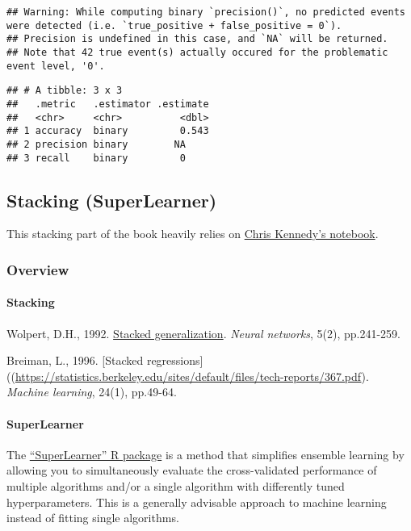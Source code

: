\documentclass[
]{book}
\begin{document}
\begin{verbatim}
## Warning: While computing binary `precision()`, no predicted events were detected (i.e. `true_positive + false_positive = 0`). 
## Precision is undefined in this case, and `NA` will be returned.
## Note that 42 true event(s) actually occured for the problematic event level, '0'.
\end{verbatim}

\begin{verbatim}
## # A tibble: 3 x 3
##   .metric   .estimator .estimate
##   <chr>     <chr>          <dbl>
## 1 accuracy  binary         0.543
## 2 precision binary        NA    
## 3 recall    binary         0
\end{verbatim}

\hypertarget{stacking-superlearner}{%
\subsection{Stacking (SuperLearner)}\label{stacking-superlearner}}

This stacking part of the book heavily relies on \href{https://github.com/dlab-berkeley/Machine-Learning-in-R/blob/master/07-ensembles.Rmd}{Chris Kennedy's notebook}.

\hypertarget{overview}{%
\subsubsection{Overview}\label{overview}}

\hypertarget{stacking}{%
\paragraph{Stacking}\label{stacking}}

Wolpert, D.H., 1992. \href{http://citeseerx.ist.psu.edu/viewdoc/summary?doi=10.1.1.56.1533}{Stacked generalization}. \emph{Neural networks}, 5(2), pp.241-259.

Breiman, L., 1996. {[}Stacked regressions{]}((\url{https://statistics.berkeley.edu/sites/default/files/tech-reports/367.pdf}). \emph{Machine learning}, 24(1), pp.49-64.

\hypertarget{superlearner}{%
\paragraph{SuperLearner}\label{superlearner}}

The \href{https://cran.r-project.org/web/packages/SuperLearner/index.html}{``SuperLearner'' R package} is a method that simplifies ensemble learning by allowing you to simultaneously evaluate the cross-validated performance of multiple algorithms and/or a single algorithm with differently tuned hyperparameters. This is a generally advisable approach to machine learning instead of fitting single algorithms.
\end{document}
